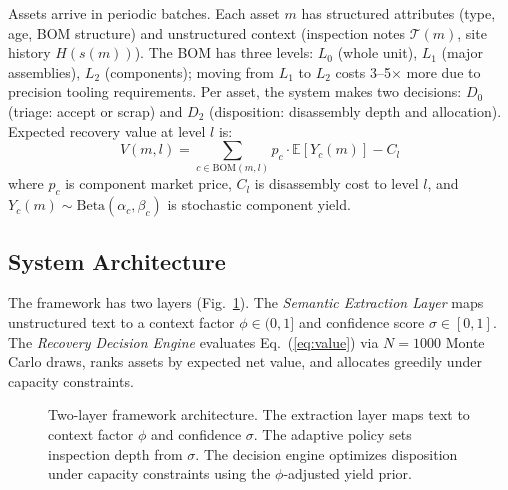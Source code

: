 \documentclass[conference]{IEEEtran}
\begin{document}
Assets arrive in periodic batches. Each asset $m$ has structured attributes
(type, age, BOM structure) and unstructured context (inspection notes
$\mathcal{T}(m)$, site history $H(s(m))$). The BOM has three levels: $L_0$
(whole unit), $L_1$ (major assemblies), $L_2$ (components); moving from $L_1$
to $L_2$ costs 3--5$\times$ more due to precision tooling requirements.
Per asset, the system makes two decisions: $D_0$ (triage: accept or scrap) and
$D_2$ (disposition: disassembly depth and allocation). Expected recovery value at
level $l$ is:
\begin{equation}
V(m,l) = \sum_{c\in\text{BOM}(m,l)} p_c\cdot\mathbb{E}[Y_c(m)] - C_l
\label{eq:value}
\end{equation}
where $p_c$ is component market price, $C_l$ is disassembly cost to level $l$,
and $Y_c(m)\sim\text{Beta}(\alpha_c,\beta_c)$ is stochastic component yield.

\subsection{System Architecture}

The framework has two layers (Fig.~\ref{fig:arch}). The \emph{Semantic Extraction
Layer} maps unstructured text to a context factor $\phi\in(0,1]$ and confidence
score $\sigma\in[0,1]$. The \emph{Recovery Decision Engine} evaluates
Eq.~(\ref{eq:value}) via $N{=}1000$ Monte Carlo draws, ranks assets by expected
net value, and allocates greedily under capacity constraints.

\begin{figure}[!t]
\centering
{}
\caption{Two-layer framework architecture. The extraction layer maps text to
context factor $\phi$ and confidence $\sigma$. The adaptive policy sets
inspection depth from $\sigma$. The decision engine optimizes disposition under
capacity constraints using the $\phi$-adjusted yield prior.}
\label{fig:arch}
\end{figure}
\end{document}
